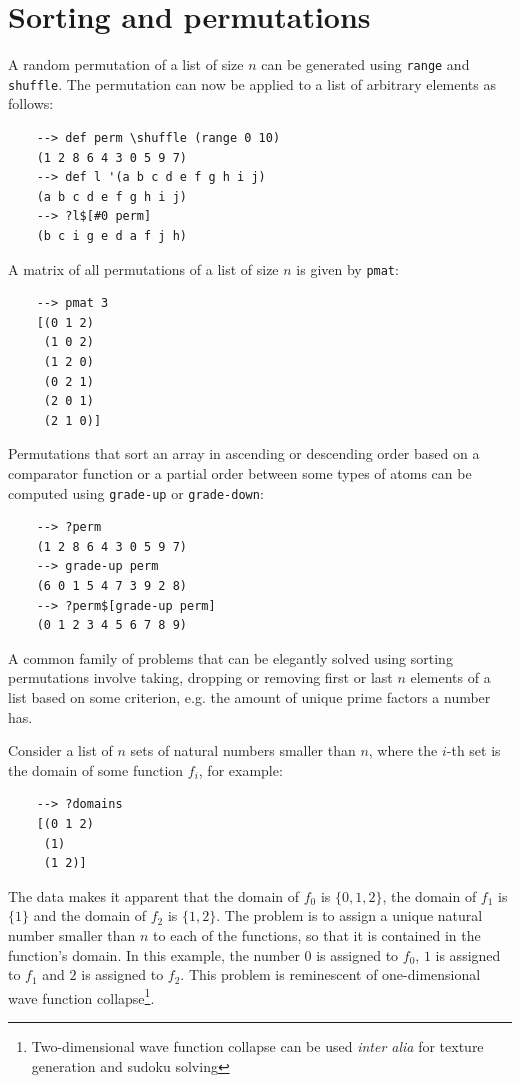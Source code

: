 \section{Sorting and permutations}

A random permutation of a list of size $n$ can be generated using \verb|range| and \verb|shuffle|. The permutation can now be applied to a list of arbitrary elements as follows:

\begin{Verbatim}
    --> def perm \shuffle (range 0 10)
    (1 2 8 6 4 3 0 5 9 7)
    --> def l '(a b c d e f g h i j)
    (a b c d e f g h i j)
    --> ?l$[#0 perm]
    (b c i g e d a f j h)
\end{Verbatim}

A matrix of all permutations of a list of size $n$ is given by \verb|pmat|:

\begin{Verbatim}
    --> pmat 3
    [(0 1 2)
     (1 0 2)
     (1 2 0)
     (0 2 1)
     (2 0 1)
     (2 1 0)]
\end{Verbatim}

Permutations that sort an array in ascending or descending order based on a comparator function or a partial order between some types of atoms can be computed using \verb|grade-up| or \verb|grade-down|:

\begin{Verbatim}
    --> ?perm
    (1 2 8 6 4 3 0 5 9 7)
    --> grade-up perm
    (6 0 1 5 4 7 3 9 2 8)
    --> ?perm$[grade-up perm]
    (0 1 2 3 4 5 6 7 8 9)
\end{Verbatim}

A common family of problems that can be elegantly solved using sorting permutations involve taking, dropping or removing first or last $n$ elements of a list based on some criterion, e.g. the amount of unique prime factors a number has.

Consider a list of $n$ sets of natural numbers smaller than $n$, where the $i$-th set is the domain of some function $f_i$, for example:

\begin{Verbatim}
    --> ?domains
    [(0 1 2)
     (1)
     (1 2)]
\end{Verbatim}

The data makes it apparent that the domain of $f_0$ is $\{0,1,2\}$, the domain of $f_1$ is $\{1\}$ and the domain of $f_2$ is $\{1,2\}$. The problem is to assign a unique natural number smaller than $n$ to each of the functions, so that it is contained in the function's domain. In this example, the number $0$ is assigned to $f_0$, $1$ is assigned to $f_1$ and $2$ is assigned to $f_2$. This problem is reminescent of one-dimensional wave function collapse\footnote{Two-dimensional wave function collapse can be used \textit{inter alia} for texture generation and sudoku solving}.

